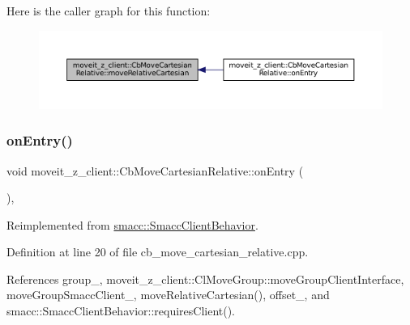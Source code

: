 Here is the caller graph for this function\+:
\nopagebreak
\begin{figure}[H]
\begin{center}
\leavevmode
\includegraphics[width=350pt]{classmoveit__z__client_1_1CbMoveCartesianRelative_aa8535a52826c36b103abebba6da7737f_icgraph}
\end{center}
\end{figure}
\mbox{\label{classmoveit__z__client_1_1CbMoveCartesianRelative_aaea0e6c7431f93301a77269b8fa539f8}} 
\subsubsection{\texorpdfstring{on\+Entry()}{onEntry()}}
{\footnotesize\ttfamily void moveit\+\_\+z\+\_\+client\+::\+Cb\+Move\+Cartesian\+Relative\+::on\+Entry (\begin{DoxyParamCaption}{ }\end{DoxyParamCaption})\hspace{0.3cm}{\ttfamily [override]}, {\ttfamily [virtual]}}



Reimplemented from \hyperlink{classsmacc_1_1SmaccClientBehavior_a7962382f93987c720ad432fef55b123f}{smacc\+::\+Smacc\+Client\+Behavior}.



Definition at line 20 of file cb\+\_\+move\+\_\+cartesian\+\_\+relative.\+cpp.



References group\+\_\+, moveit\+\_\+z\+\_\+client\+::\+Cl\+Move\+Group\+::move\+Group\+Client\+Interface, move\+Group\+Smacc\+Client\+\_\+, move\+Relative\+Cartesian(), offset\+\_\+, and smacc\+::\+Smacc\+Client\+Behavior\+::requires\+Client().


